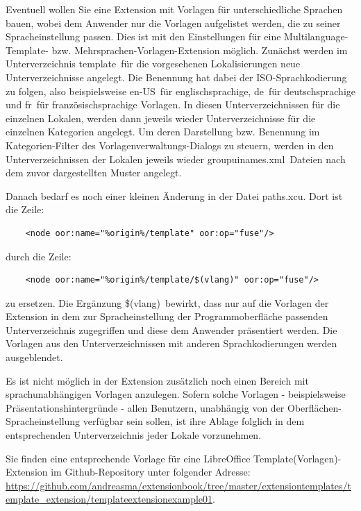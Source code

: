 \documentclass[12pt,a4paper,titlepage]{book}
\begin{document}
Eventuell wollen Sie eine Extension mit Vorlagen für unterschiedliche Sprachen bauen, wobei dem Anwender nur die Vorlagen aufgelistet werden, die zu seiner Spracheinstellung passen. Dies ist mit den Einstellungen für eine Multilanguage-Template- bzw. Mehrsprachen-Vorlagen-Extension möglich. Zunächst werden im Unterverzeichnis \glqq template\grqq~für die vorgesehenen Lokalisierungen neue Unterverzeichnisse angelegt. Die Benennung hat dabei der ISO-Sprachkodierung zu folgen, also  beispielsweise \glqq en-US\grqq~für englischsprachige, \glqq de\grqq~für deutschsprachige und \glqq fr\grqq~für französischsprachige Vorlagen. In diesen Unterverzeichnissen für die einzelnen Lokalen, werden dann jeweils wieder Unterverzeichnisse für die einzelnen Kategorien angelegt. Um deren Darstellung bzw. Benennung im Kategorien-Filter des Vorlagenverwaltungs-Dialogs zu steuern, werden in den Unterverzeichnissen der Lokalen jeweils wieder \glqq groupuinames.xml\grqq~Dateien nach dem zuvor dargestellten Muster angelegt.

Danach bedarf es noch einer kleinen Änderung in der Datei \glqq paths.xcu\grqq. Dort ist die Zeile:
\begin{lstlisting}
	<node oor:name="%origin%/template" oor:op="fuse"/>
\end{lstlisting}

durch die Zeile:
\begin{lstlisting}
	<node oor:name="%origin%/template/$(vlang)" oor:op="fuse"/>
\end{lstlisting}

zu ersetzen. Die Ergänzung \glqq \$(vlang)\grqq~bewirkt, dass nur auf die Vorlagen der Extension in dem zur Spracheinstellung der Programmoberfläche passenden Unterverzeichnis zugegriffen und diese dem Anwender präsentiert werden. Die Vorlagen aus den Unterverzeichnissen mit anderen Sprachkodierungen werden ausgeblendet.

Es ist nicht möglich in der Extension zusätzlich noch einen Bereich mit sprachunabhängigen Vorlagen anzulegen. Sofern solche Vorlagen - beispielsweise Präsentationshintergründe - allen Benutzern, unabhängig von der \linebreak Oberflächen-Spracheinstellung verfügbar sein sollen, ist ihre Ablage folglich in dem entsprechenden Unterverzeichnis jeder Lokale vorzunehmen.

Sie finden eine entsprechende Vorlage für eine LibreOffice \linebreak Template(Vorlagen)-Extension im Github-Repository unter folgender Adresse:\linebreak
\url{https://github.com/andreasma/extensionbook/tree/master/extensiontemplates/template_extension/templateextensionexample01}.
\end{document}
